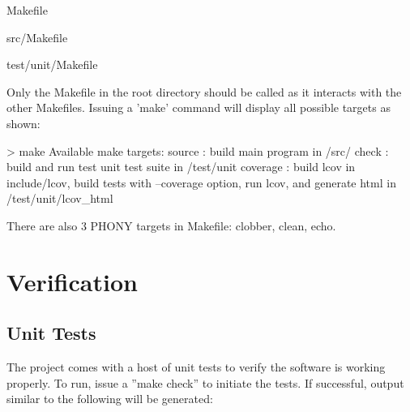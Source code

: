 \begin{DoxyItemize}
\item Makefile 
\item src/Makefile 
\item test/unit/Makefile 
\end{DoxyItemize}

Only the Makefile in the root directory should be called as it interacts with the other Makefiles. Issuing a 'make' command will display all possible targets as shown:


\begin{DoxyPre} > make
Available make targets:
  source    : build main program in /src/
  check     : build and run test unit test suite in /test/unit
  coverage  : build lcov in include/lcov, build tests with --coverage option, run lcov, and generate html in /test/unit/lcov\_html
 \end{DoxyPre}


There are also 3 PHONY targets in Makefile: clobber, clean, echo.\hypertarget{index_test}{}\section{Verification}\label{index_test}
\hypertarget{index_unit}{}\subsection{Unit Tests}\label{index_unit}
The project comes with a host of unit tests to verify the software is working properly. To run, issue a ''make check'' to initiate the tests. If successful, output similar to the following will be generated:


